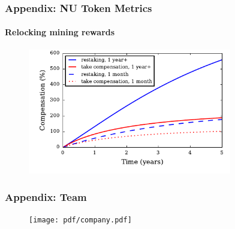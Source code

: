 \documentclass[xetex,mathsans,sans,aspectratio=169]{beamer}
\begin{document}
    \begin{frame}
        \frametitle{Appendix: NU Token Metrics}
        \framesubtitle{Relocking mining rewards}
        \begin{figure}
            \centering
            \includegraphics[height=5.5cm]{pdf/total-compensation.pdf}
        \end{figure}
    \end{frame}

    \begin{frame}
      \frametitle{Appendix: Team}
        \begin{figure}
            \centering
            \texttt{[image: pdf/company.pdf]}
        \end{figure}
    \end{frame}
\end{document}

